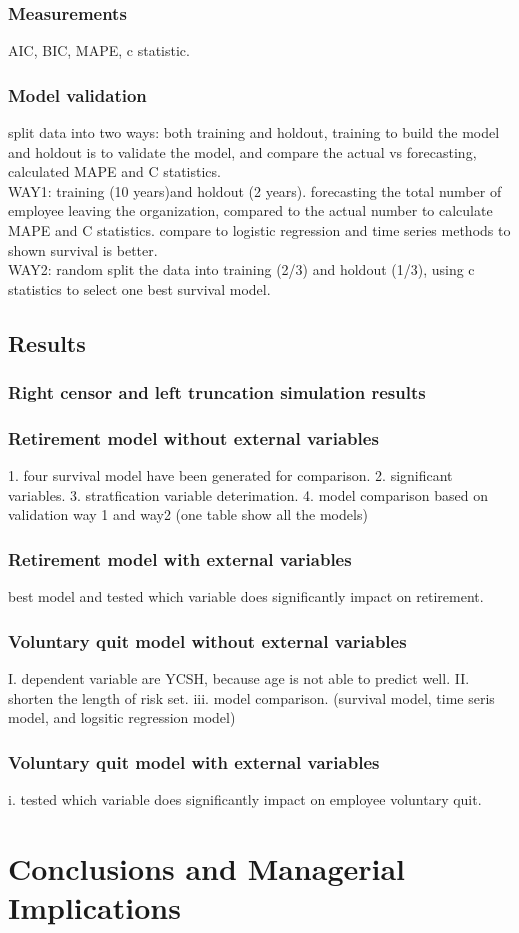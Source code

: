 \documentclass[12pt,letterpaper]{article}
\begin{document}
\subsubsection{Measurements}
 AIC, BIC, MAPE, c statistic.\\
\subsubsection{Model validation}
       split data into two ways: both training and holdout, training to build the model and holdout is to validate the model, and compare the actual vs forecasting, calculated MAPE and C statistics. \\ 
       WAY1: training (10 years)and holdout (2 years). forecasting the total number of employee leaving the organization, compared to the actual number to calculate MAPE and C statistics. compare to logistic regression and time series methods to shown survival is better.\\
       WAY2: random split the data into training (2/3) and holdout (1/3), using c statistics to select one best survival model.
  
\subsection{Results}
\subsubsection{Right censor and left truncation simulation results}
\subsubsection{Retirement model without external variables}
   1. four survival model have been generated for comparison. 
   2. significant variables.
   3. stratfication variable deterimation.
   4. model comparison based on validation way 1 and way2 (one table show all the models) 
\subsubsection{Retirement model with external variables}
     best model and tested which variable does significantly impact on retirement.
\subsubsection{Voluntary quit model without external variables}   
     I. dependent variable are YCSH, because age is not able to predict well.
     II. shorten the length of risk set.
     iii. model comparison. (survival model, time seris model, and logsitic regression model)
\subsubsection{Voluntary quit model with external variables}
    i. tested which variable does significantly impact on employee voluntary quit.
     

\section{Conclusions and Managerial Implications} 


	
\end{document}
